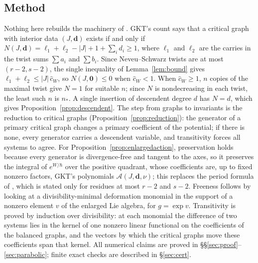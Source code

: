 \documentclass[11pt]{amsart}
\theoremstyle{definition}
\theoremstyle{remark}
\newcommand{\chat}{\hat{c}}
\begin{document}
\subsection*{Method}
Nothing here rebuilds the machinery of \cite{GKT}.  GKT's count
\cite[Notation~2.40]{GKT} says that a critical graph with interior data
$(J,\mathbf d)$ exists if and only if
$N(J,\mathbf d)=\ell_1+\ell_2-|J|+1+\sum_i d_i\ge1$, where $\ell_1$ and $\ell_2$
are the carries in the twist sums $\sum a_i$ and $\sum b_i$.  Since
Neveu--Schwarz twists are at most $(r-2,s-2)$, the single inequality of
Lemma~\ref{lem:bound} gives $\ell_1+\ell_2\le |J|\,\chat_W$, so
$N(J,\mathbf 0)\le 0$ when $\chat_W<1$.  When $\chat_W\ge1$, $n$ copies of the
maximal twist give $N=1$ for suitable $n$; since $N$ is nondecreasing in each
twist, the least such $n$ is $n_*$.  A single insertion of descendent degree
$d$ has $N=d$, which gives Proposition~\ref{prop:descendent}.  The step from
graphs to invariants is the reduction to critical graphs
(Proposition~\ref{prop:reduction}): the generator of a primary critical graph
changes a primary coefficient of the potential; if there is none, every
generator carries a descendent variable, and transitivity forces all systems
to agree.  For Proposition~\ref{prop:enlargedaction}, preservation holds
because every generator is divergence-free and tangent to the axes, so it
preserves the integral of $e^{W/\hbar}$ over the positive quadrant, whose
coefficients are, up to fixed nonzero factors, GKT's polynomials
$\mathcal A(J,\mathbf d,\nu)$; this replaces the period formula of
\cite[Theorem~4.9]{GKT}, which is stated only for residues at most $r-2$ and
$s-2$.  Freeness follows by looking at a divisibility-minimal deformation
monomial in the support of a nonzero element $v$ of the enlarged Lie
algebra, for $g=\exp v$.  Transitivity is proved by induction
over divisibility: at each monomial the difference of two systems lies in the
kernel of one nonzero linear functional on the coefficients of the balanced
graphs, and the vectors by which the critical graphs move these coefficients
span that kernel.  All numerical claims are proved in
\S\S\ref{sec:proof}--\ref{sec:parabolic}; finite exact checks are described in
\S\ref{sec:cert}.
\end{document}
